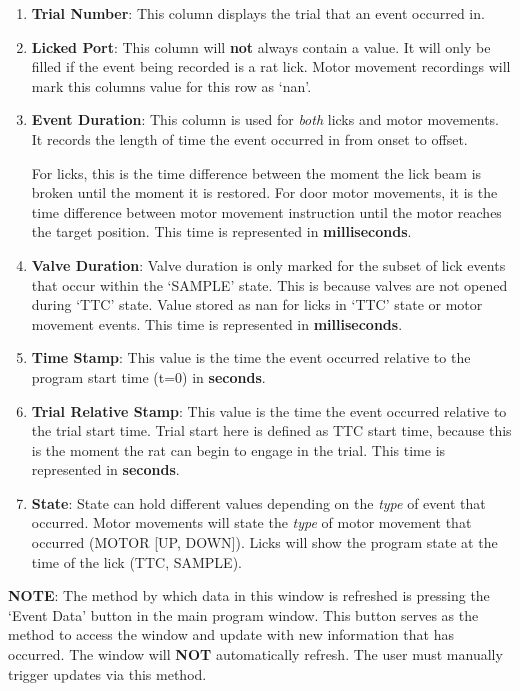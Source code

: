\documentclass{article}
\begin{document}
\begin{enumerate}
    \item \textbf{Trial Number}: This column displays the trial that an event occurred in. 
    \item \textbf{Licked Port}: This column will \textbf{not} always contain a value. It will only be filled if the event being recorded is a rat lick. Motor movement 
        recordings will mark this columns value for this row as `nan'.
    \item \textbf{Event Duration}: This column is used for \textit{both} licks and motor movements. It records the length of time the event occurred in from onset to offset. 
        
        For licks, this is the time difference between the moment the lick beam is broken until the moment it is restored. For door motor movements, it is the time 
        difference between motor movement instruction until the motor reaches the target position. This time is represented in \textbf{milliseconds}.
    \item \textbf{Valve Duration}: Valve duration is only marked for the subset of lick events that occur within the `SAMPLE' state. This is because valves are not 
        opened during `TTC' state. Value stored as nan for licks in `TTC' state or motor movement events. This time is represented in \textbf{milliseconds}.
    \item \textbf{Time Stamp}: This value is the time the event occurred relative to the program start time (t=0) in \textbf{seconds}.
    \item \textbf{Trial Relative Stamp}: This value is the time the event occurred relative to the trial start time. Trial start here is defined as TTC start time, because 
        this is the moment the rat can begin to engage in the trial. This time is represented in \textbf{seconds}.
    \item \textbf{State}: State can hold different values depending on the \textit{type} of event that occurred. Motor movements will state the \textit{type} of motor movement 
        that occurred (MOTOR [UP, DOWN]). Licks will show the program state at the time of the lick (TTC, SAMPLE).
\end{enumerate}
\textbf{NOTE}: The method by which data in this window is refreshed is pressing the `Event Data' button in the main program window. This button serves as the method to 
access the window and update with new information that has occurred. The window will \textbf{NOT} automatically refresh. The user must manually trigger updates via this 
method.
\end{document}
